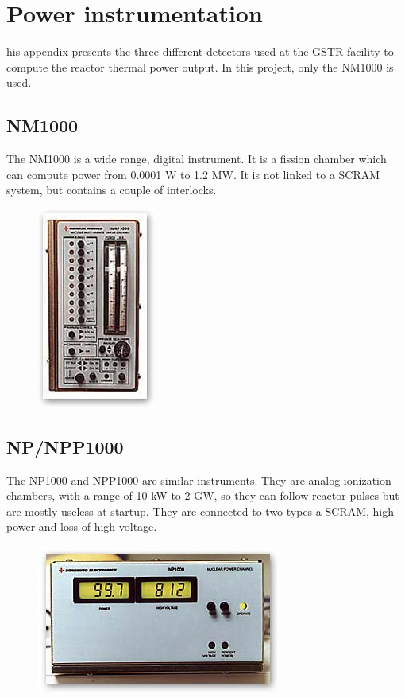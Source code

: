 %
%

\chapter{Power instrumentation}
\label{app:app03}

his appendix presents the three different detectors used at the GSTR facility to compute the reactor thermal power output. In this project, only the NM1000 is used.

\section{NM1000}
The NM1000 is a wide range, digital instrument. It is a fission chamber which can compute power from 0.0001 W to 1.2 MW. It is not linked to a SCRAM system, but contains a couple of interlocks.


\begin{figure}[!t]
	\centering
	\includegraphics[height=0.4\textheight]{figa/nm1000}
	\label{fig:nm1000}
\end{figure}


\section{NP/NPP1000}

The NP1000 and NPP1000 are similar instruments. They are analog ionization chambers, with a range of 10 kW to 2 GW, so they can follow reactor pulses but are mostly useless at startup. They are connected to two types a SCRAM, high power and loss of high voltage.

\begin{figure}[!t]
	\centering
	\includegraphics[height=0.4\textheight]{figa/np1000}
	\label{fig:np1000}
\end{figure}


\
